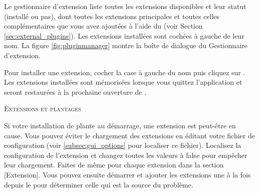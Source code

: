 Le gestionnaire d'extension liste toutes les extensions disponibles et leur statut (installé ou pas), dont toutes les extensions principales et toutes celles complémentaires que vous avez ajoutées à l'aide du  (voir Section \ref{sec:external_plugins}). Les extensions installées sont cochées à gauche de leur nom. La figure \ref{fig:pluginmanager} montre la boîte de dialogue du Gestionnaire d'extension.

Pour installer une extension, cocher la case à gauche du nom puis cliquez sur . Les extensions installées sont mémorisées lorsque vous quittez l'application et seront restaurées à la prochaine ouverture de \qg.

\begin{Tip}\caption{\textsc{Extensions et plantages}}
Si votre installation de \qg plante au démarrage, une extension est peut-être en cause. Vous pouvez éviter le chargement des extensions en éditant votre fichier de configuration (voir \ref{subsec:gui_options} pour localiser ce fichier). Localisez la configuration de l'extension et changez toutes les valeurs à false pour empêcher leur chargement.  Faites de même pour chaque extension dans la section [Extension]. Vous pouvez ensuite démarrer \qg et ajouter les extensions une à la fois depuis le  pour déterminer celle qui est la source du problème.
\end{Tip}


